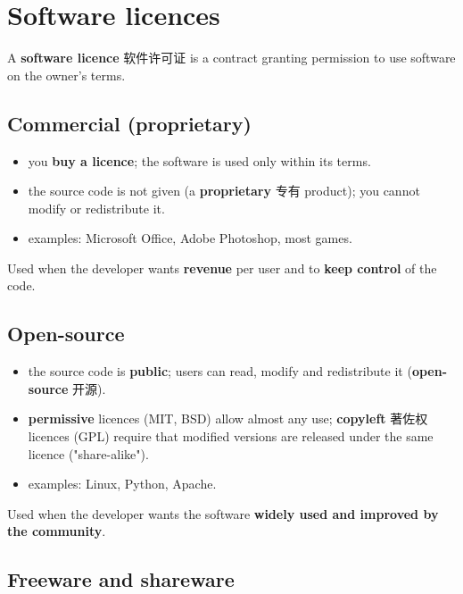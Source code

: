\documentclass[11pt]{article}
\begin{document}
\section*{Software licences}

A \textbf{software licence} 软件许可证 is a contract granting permission to use software on the owner's terms.

\subsection*{Commercial (proprietary)}

\begin{itemize}
\item you \textbf{buy a licence}; the software is used only within its terms.

\item the source code is not given (a \textbf{proprietary} 专有 product); you cannot modify or redistribute it.

\item examples: Microsoft Office, Adobe Photoshop, most games.

\end{itemize}

Used when the developer wants \textbf{revenue} per user and to \textbf{keep control} of the code.

\subsection*{Open-source}

\begin{itemize}
\item the source code is \textbf{public}; users can read, modify and redistribute it (\textbf{open-source} 开源).

\item \textbf{permissive} licences (MIT, BSD) allow almost any use; \textbf{copyleft} 著佐权 licences (GPL) require that modified versions are released under the same licence ("share-alike").

\item examples: Linux, Python, Apache.

\end{itemize}

Used when the developer wants the software \textbf{widely used and improved by the community}.

\subsection*{Freeware and shareware}
\end{document}
